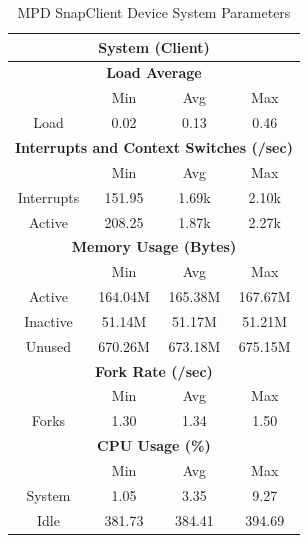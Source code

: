 \documentclass[11pt,a4paper]{scrreprt}
\begin{document}
\begin{table}[H]
\centering
    \begin{tabular}{||c|c|c|c|c|c|c||}
    \hline
    \multicolumn{7}{|c|}{\textbf{System (Client)}} \\
    \hline
    \multicolumn{7}{|c|}{\textbf{Load Average}} \\
    \hline\hline
      & \multicolumn{2}{|c|}{Min} & \multicolumn{2}{|c|}{Avg} & \multicolumn{2}{|c|}{Max} \\
    \hline
    Load & \multicolumn{2}{|c|}{0.02} & \multicolumn{2}{|c|}{0.13} & \multicolumn{2}{|c|}{0.46} \\
    \hline\hline
    \multicolumn{7}{|c|}{\textbf{Interrupts and Context Switches (/sec)}} \\
    \hline
      & \multicolumn{2}{|c|}{Min} & \multicolumn{2}{|c|}{Avg} & \multicolumn{2}{|c|}{Max} \\
    \hline
    Interrupts & \multicolumn{2}{|c|}{151.95} & \multicolumn{2}{|c|}{1.69k} & \multicolumn{2}{|c|}{2.10k} \\
    \hline
    Active & \multicolumn{2}{|c|}{208.25} & \multicolumn{2}{|c|}{1.87k} & \multicolumn{2}{|c|}{2.27k} \\
    \hline\hline
    \multicolumn{7}{|c|}{\textbf{Memory Usage (Bytes)}} \\
    \hline\hline
      & \multicolumn{2}{|c|}{Min} & \multicolumn{2}{|c|}{Avg} & \multicolumn{2}{|c|}{Max} \\
    \hline
    Active & \multicolumn{2}{|c|}{164.04M} & \multicolumn{2}{|c|}{165.38M} & \multicolumn{2}{|c|}{167.67M} \\
    \hline
    Inactive & \multicolumn{2}{|c|}{51.14M} & \multicolumn{2}{|c|}{51.17M} & \multicolumn{2}{|c|}{51.21M} \\
    \hline
    Unused & \multicolumn{2}{|c|}{670.26M} & \multicolumn{2}{|c|}{673.18M} & \multicolumn{2}{|c|}{675.15M} \\
    \hline\hline
    \multicolumn{7}{|c|}{\textbf{Fork Rate (/sec)}} \\
    \hline\hline
      & \multicolumn{2}{|c|}{Min} & \multicolumn{2}{|c|}{Avg} & \multicolumn{2}{|c|}{Max} \\
    \hline
    Forks & \multicolumn{2}{|c|}{1.30} & \multicolumn{2}{|c|}{1.34} & \multicolumn{2}{|c|}{1.50} \\
    \hline\hline
    \multicolumn{7}{|c|}{\textbf{CPU Usage (\%)}} \\
    \hline\hline
      & \multicolumn{2}{|c|}{Min} & \multicolumn{2}{|c|}{Avg} & \multicolumn{2}{|c|}{Max} \\
    \hline
    System & \multicolumn{2}{|c|}{1.05} & \multicolumn{2}{|c|}{3.35} & \multicolumn{2}{|c|}{9.27} \\
    \hline
    Idle & \multicolumn{2}{|c|}{381.73} & \multicolumn{2}{|c|}{384.41} & \multicolumn{2}{|c|}{394.69} \\
    \hline\hline
    \end{tabular}
    \caption{MPD SnapClient Device System Parameters}
    \label{MPDclientSysTab}
\end{table}
\end{document}

